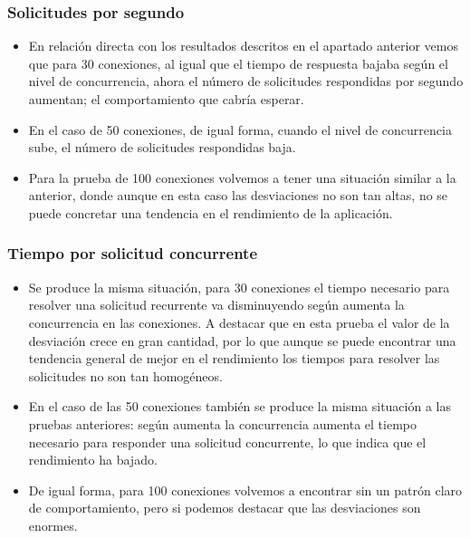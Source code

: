\subsubsection{Solicitudes por segundo}
\begin{itemize}
	\item En relación directa con los resultados descritos en el apartado anterior vemos que para 30 conexiones, al igual que el tiempo de respuesta bajaba según el nivel de concurrencia, ahora el número de solicitudes respondidas por segundo aumentan; el comportamiento que cabría esperar.
	\item En el caso de 50 conexiones, de igual forma, cuando el nivel de concurrencia sube, el número de solicitudes respondidas baja.
	\item Para la prueba de 100 conexiones volvemos a tener una situación similar a la anterior, donde aunque en esta caso las desviaciones no son tan altas, no se puede concretar una tendencia en el rendimiento de la aplicación.
\end{itemize}

\subsubsection{Tiempo por solicitud concurrente}
\begin{itemize}
	\item Se produce la misma situación, para 30 conexiones el tiempo necesario para resolver una solicitud recurrente va disminuyendo según aumenta la concurrencia en las conexiones. A destacar que en esta prueba el valor de la desviación crece en gran cantidad, por lo que aunque se puede encontrar una tendencia general de mejor en el rendimiento los tiempos para resolver las solicitudes no son tan homogéneos.
	\item En el caso de las 50 conexiones también se produce la misma situación a las pruebas anteriores: según aumenta la concurrencia aumenta el tiempo necesario para responder una solicitud concurrente, lo que indica que el rendimiento ha bajado.
	\item De igual forma, para 100 conexiones volvemos a encontrar sin un patrón claro de comportamiento, pero si podemos destacar que las desviaciones son enormes.
\end{itemize}

